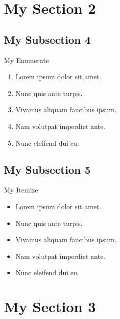 \documentclass[12pt]{beamer}
\begin{document}
\section{My Section 2}
\subsection{My Subsection 4}
\begin{frame}
  \begin{block}{My Enumerate}
    \begin{enumerate}
      \item{Lorem ipsum dolor sit amet.}
      \item{Nunc quis ante turpis.}
      \item{Vivamus aliquam faucibus ipsum.}
      \item{Nam volutpat imperdiet ante.}
      \item{Nunc eleifend dui eu.}
    \end{enumerate}
  \end{block}
\end{frame}

\subsection{My Subsection 5}
\begin{frame}
  \begin{block}{My Itemize}
    \begin{itemize}
      \item{Lorem ipsum dolor sit amet.}
      \item{Nunc quis ante turpis.}
      \item{Vivamus aliquam faucibus ipsum.}
      \item{Nam volutpat imperdiet ante.}
      \item{Nunc eleifend dui eu.}
    \end{itemize}
  \end{block}
\end{frame}


\section{My Section 3}
\end{document}
